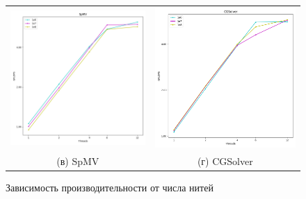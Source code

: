 \documentclass[12pt, a4paper]{article}
\begin{document}
\begin{figure}[H]
\begin{tabular}{cc}
		\includegraphics[width=85mm]{2025/openmp_spmv} & \includegraphics[width=85mm]{2025/openmp_cgsolver} \\
		(в) SpMV & (г) CGSolver \\[6pt]
	\end{tabular}
	\caption{Зависимость производительности от числа нитей}
	\label{fig:multithread_flops_pc} 
\end{figure}
\end{document}
